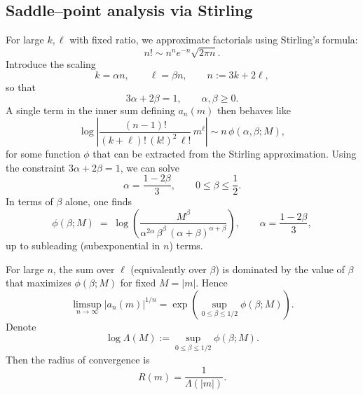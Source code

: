 \documentclass[11pt, a4paper]{article}
\numberwithin{equation}{section}
\begin{document}
\subsection{Saddle--point analysis via Stirling}
For large $k,\ell$ with fixed ratio, we approximate factorials using Stirling's
formula:
\begin{equation}
  n! \sim n^n e^{-n}\sqrt{2\pi n}.
\end{equation}
Introduce the scaling
\begin{equation}
  k = \alpha n,\qquad \ell = \beta n,\qquad
  n := 3k+2\ell,
\end{equation}
so that
\begin{equation}
  3\alpha + 2\beta = 1,\qquad \alpha,\beta\ge 0.
\end{equation}
A single term in the inner sum defining $a_n(m)$ then behaves like
\begin{equation}
  \log\left|
  \frac{(n-1)!}{(k+\ell)!\,(k!)^2\,\ell!}\,m^\ell
  \right|
  \sim n\,\phi(\alpha,\beta;M),
\end{equation}
for some function $\phi$ that can be extracted from the Stirling approximation.
Using the constraint $3\alpha+2\beta=1$, we can solve
\begin{equation}
  \alpha = \frac{1-2\beta}{3},\qquad 0\le \beta\le \frac12.
\end{equation}
In terms of $\beta$ alone, one finds
\begin{equation}
  \phi(\beta;M)
  \;=\;
  \log\!\left(
  \frac{M^\beta}{\alpha^{2\alpha}\,\beta^\beta\,(\alpha+\beta)^{\alpha+\beta}}
  \right),
  \qquad
  \alpha = \frac{1-2\beta}{3},
\end{equation}
up to subleading (subexponential in $n$) terms.

For large $n$, the sum over $\ell$ (equivalently over $\beta$) is dominated by
the value of $\beta$ that maximizes $\phi(\beta;M)$ for fixed $M=|m|$. Hence
\begin{equation}
  \limsup_{n\to\infty} |a_n(m)|^{1/n}
  = \exp\!\left(
    \sup_{0\le \beta\le 1/2} \phi(\beta;M)
  \right).
\end{equation}
Denote
\begin{equation}
  \log \Lambda(M)
  := \sup_{0\le \beta\le 1/2} \phi(\beta;M).
\end{equation}
Then the radius of convergence is
\begin{equation}
  R(m) = \frac{1}{\Lambda(|m|)}.
\end{equation}
\end{document}
